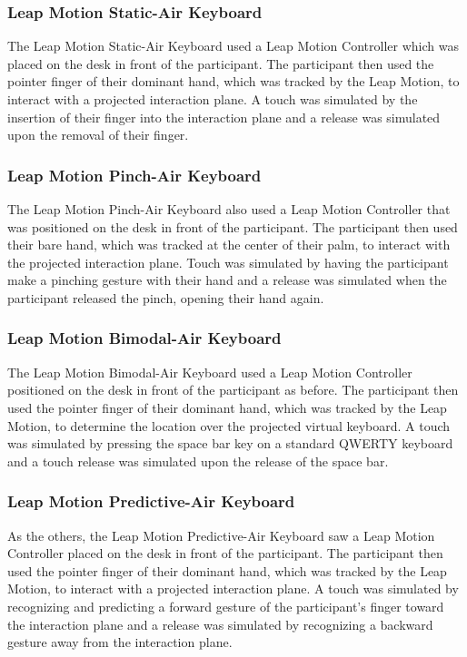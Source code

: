 \subsubsection{Leap Motion Static-Air Keyboard}
The Leap Motion Static-Air Keyboard used a Leap Motion Controller which was placed on the desk in front of the participant. The participant then used the pointer finger of their dominant hand, which was tracked by the Leap Motion, to interact with a projected interaction plane. A touch was simulated by the insertion of their finger into the interaction plane and a release was simulated upon the removal of their finger.

\subsubsection{Leap Motion Pinch-Air Keyboard}
The Leap Motion Pinch-Air Keyboard also used a Leap Motion Controller that was positioned on the desk in front of the participant. The participant then used their bare hand, which was tracked at the center of their palm, to interact with the projected interaction plane. Touch was simulated by having the participant make a pinching gesture with their hand and a release was simulated when the participant released the pinch, opening their hand again.

\subsubsection{Leap Motion Bimodal-Air Keyboard}
The Leap Motion Bimodal-Air Keyboard used a Leap Motion Controller positioned on the desk in front of the participant as before. The participant then used the pointer finger of their dominant hand, which was tracked by the Leap Motion, to determine the location over the projected virtual keyboard. A touch was simulated by pressing the space bar key on a standard QWERTY keyboard and a touch release was simulated upon the release of the space bar.

\subsubsection{Leap Motion Predictive-Air Keyboard}
As the others, the Leap Motion Predictive-Air Keyboard saw a Leap Motion Controller placed on the desk in front of the participant. The participant then used the pointer finger of their dominant hand, which was tracked by the Leap Motion, to interact with a projected interaction plane. A touch was simulated by recognizing and predicting a forward gesture of the participant's finger toward the interaction plane and a release was simulated by recognizing a backward gesture away from the interaction plane.

